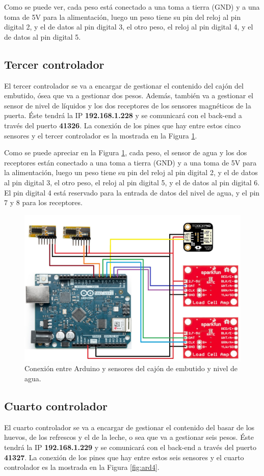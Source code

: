 \newpage
Como se puede ver, cada peso está conectado a una toma a tierra (GND) y a una toma de 5V para la alimentación, luego un peso tiene su pin del reloj al pin digital 2, y el de datos al pin digital 3, el otro peso, el reloj al pin digital 4, y el de datos al pin digital 5.

\subsection{Tercer controlador}

El tercer controlador se va a encargar de gestionar el contenido del cajón del embutido, ósea que va a gestionar dos pesos. Además, también va a gestionar el sensor de nivel de líquidos y los dos receptores de los sensores magnéticos de la puerta. Éste tendrá la IP \textbf{192.168.1.228} y se comunicará con el back-end a través del puerto \textbf{41326}. La conexión de los pines que hay entre estos cinco sensores y el tercer controlador es la mostrada en la Figura \ref{fig:ard3}.

Como se puede apreciar en la Figura \ref{fig:ard3}, cada peso, el sensor de agua y los dos receptores están conectado a una toma a tierra (GND) y a una toma de 5V para la alimentación, luego un peso tiene su pin del reloj al pin digital 2, y el de datos al pin digital 3, el otro peso, el reloj al pin digital 5, y el de datos al pin digital 6. El pin digital 4 está reservado para la entrada de datos del nivel de agua, y el pin 7 y 8 para los receptores.

\begin{figure}[h] 
    \centering
    \includegraphics[width=.54\textwidth]{capitulos/capitulo6/ard3.jpg}
    \caption{Conexión entre Arduino y sensores del cajón de embutido y nivel de agua.}
    \label{fig:ard3}
\end{figure}

\subsection{Cuarto controlador}
El cuarto controlador se va a encargar de gestionar el contenido del basar de los huevos, de los refrescos y el de la leche, o sea que va a gestionar seis pesos. Éste tendrá la IP \textbf{192.168.1.229} y se comunicará con el back-end a través del puerto \textbf{41327}. La conexión de los pines que hay entre estos seis sensores y el cuarto controlador es la mostrada en la Figura \ref{fig:ard4}.

